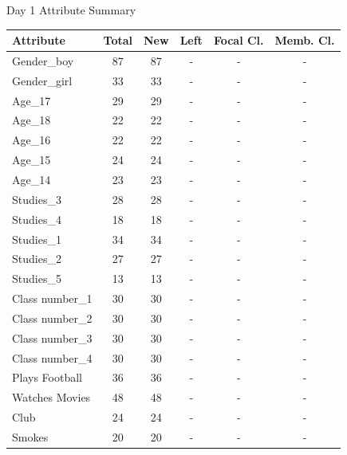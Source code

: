 \begin{question}
\begin{subquestion}
{		\begin{center}		
			Day 1 Attribute Summary
			\begin{tabular}{lccccc}
				\hline
				Attribute          & Total & New & Left & Focal Cl. & Memb. Cl. \\ \hline
				Gender\_boy        & 87    & 87  & -    & -         & -         \\
				Gender\_girl       & 33    & 33  & -    & -         & -         \\
				Age\_17            & 29    & 29  & -    & -         & -         \\
				Age\_18            & 22    & 22  & -    & -         & -         \\
				Age\_16            & 22    & 22  & -    & -         & -         \\
				Age\_15            & 24    & 24  & -    & -         & -         \\
				Age\_14            & 23    & 23  & -    & -         & -         \\
				Studies\_3         & 28    & 28  & -    & -         & -         \\
				Studies\_4         & 18    & 18  & -    & -         & -         \\
				Studies\_1         & 34    & 34  & -    & -         & -         \\
				Studies\_2         & 27    & 27  & -    & -         & -         \\
				Studies\_5         & 13    & 13  & -    & -         & -         \\
				Class number\_1    & 30    & 30  & -    & -         & -         \\
				Class number\_2    & 30    & 30  & -    & -         & -         \\
				Class number\_3    & 30    & 30  & -    & -         & -         \\
				Class number\_4    & 30    & 30  & -    & -         & -         \\
				Plays Football     & 36    & 36  & -    & -         & -         \\
				Watches Movies     & 48    & 48  & -    & -         & -         \\
				Club               & 24    & 24  & -    & -         & -         \\
				Smokes             & 20    & 20  & -    & -         & -         \\ \hline
			\end{tabular}
		\end{center}
		
}
\end{subquestion}
\end{question}
